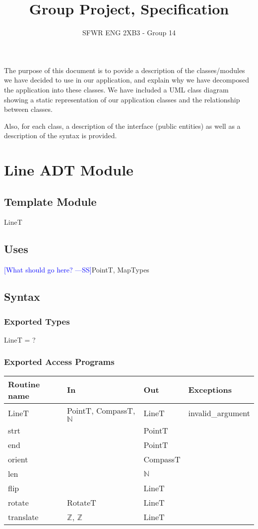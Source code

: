 \documentclass[12pt]{article}
\title{Group Project, Specification}
\author{SFWR ENG 2XB3 - Group 14}
\newcommand{\authornote}[3]{\textcolor{#1}{[#3 ---#2]}}
\newcommand{\authornote}[3]{}
\newcommand{\wss}[1]{\authornote{blue}{SS}{#1}}
\begin{document}
\maketitle

The purpose of this document is to  povide a description of the classes/modules we have decided to use in our application, and explain why we have decomposed the application into these classes. We have included a UML class diagram showing a static representation of our application classes and the relationship between classes.

Also, for each class, a description of the interface (public entities) as well as a description of the syntax is provided.


\newpage

\section* {Line ADT Module}

\subsection*{Template Module}

LineT

\subsection* {Uses}

\wss{What should go here?}PointT, MapTypes

\subsection* {Syntax}

\subsubsection* {Exported Types}

LineT = ?

\subsubsection* {Exported Access Programs}

\begin{tabular}{| l | l | l | l |}
\hline
\textbf{Routine name} & \textbf{In} & \textbf{Out} & \textbf{Exceptions}\\
\hline
LineT & PointT, CompassT, $\mathbb{N}$ & LineT & invalid\_argument\\
\hline
strt & ~ & PointT & ~\\
\hline
end & ~ & PointT & ~\\
\hline
orient & ~ & CompassT & ~\\
\hline
 len & ~ & $\mathbb{N}$ & ~\\
\hline
flip & ~ & LineT & ~\\
\hline
rotate & RotateT & LineT & ~\\
\hline
translate & $\mathbb{Z}$, $\mathbb{Z}$ & LineT  & ~\\
\hline
\end{tabular}
\end{document}
